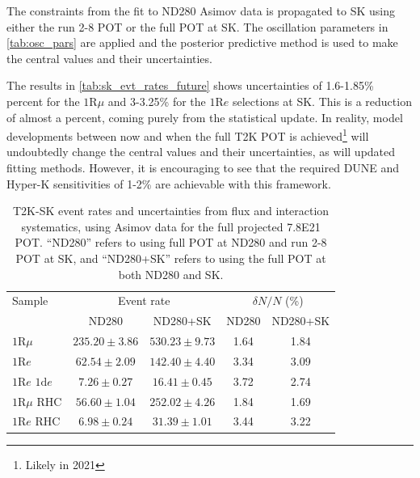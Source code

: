 The constraints from the fit to ND280 Asimov data is propagated to SK using either the run 2-8 POT or the full POT at SK. The oscillation parameters in \autoref{tab:osc_pars} are applied and the posterior predictive method is used to make the central values and their uncertainties. 

The results in \autoref{tab:sk_evt_rates_future} shows uncertainties of 1.6-1.85\% percent for the $1\text{R}\mu$ and 3-3.25\% for the $1\text{R}e$ selections at SK. This is a reduction of almost a percent, coming purely from the statistical update. In reality, model developments between now and when the full T2K POT is achieved\footnote{Likely in 2021\cite{t2k_ii}} will undoubtedly change the central values and their uncertainties, as will updated fitting methods. However, it is encouraging to see that the required DUNE and Hyper-K sensitivities of 1-2\% are achievable with this framework.
\begin{table}[h]
	\begin{tabular}{l | c c | c c }
		\hline
		\hline
		Sample  & \multicolumn{2}{c|}{Event rate} & \multicolumn{2}{c}{$\delta N/N$ (\%)} \\
		& ND280 & ND280+SK & ND280 & ND280+SK \\
		\hline
		$1\text{R}\mu$ & $235.20\pm3.86$ & $530.23\pm9.73$ & 1.64 & 1.84 \\
		$1\text{R}e$  & $62.54\pm2.09$ & $142.40\pm4.40$ & 3.34 & 3.09 \\
		$1\text{R}e \text{ 1d}e$ & $7.26\pm0.27$ & $16.41\pm0.45$ & 3.72 & 2.74 \\
		
		$1\text{R}\mu \text{ RHC}$  & $56.60\pm1.04$ & $252.02\pm4.26$ & 1.84 & 1.69 \\
		$1\text{R}e \text{ RHC}$ & $6.98\pm0.24$ & $31.39\pm1.01$ & 3.44 & 3.22 \\
		\hline
		\hline
	\end{tabular}
	\caption{T2K-SK event rates and uncertainties from flux and interaction systematics, using Asimov data for the full projected 7.8E21 POT. ``ND280'' refers to using full POT at ND280 and run 2-8 POT at SK, and ``ND280+SK'' refers to using the full POT at both ND280 and SK.}
	\label{tab:sk_evt_rates_future}
\end{table}
